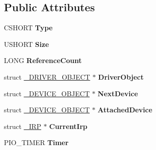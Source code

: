 \subsection*{Public Attributes}
\begin{DoxyCompactItemize}
\item 
\hypertarget{struct__DEVICE__OBJECT_aa853bf7717fd7265dde1ec5466b9235d}{}C\+S\+H\+O\+R\+T {\bfseries Type}\label{struct__DEVICE__OBJECT_aa853bf7717fd7265dde1ec5466b9235d}

\item 
\hypertarget{struct__DEVICE__OBJECT_ae5b447d318de73f431238d3339dd2c8c}{}U\+S\+H\+O\+R\+T {\bfseries Size}\label{struct__DEVICE__OBJECT_ae5b447d318de73f431238d3339dd2c8c}

\item 
\hypertarget{struct__DEVICE__OBJECT_afe2db4a77b5b7c42471e1739bbe73620}{}L\+O\+N\+G {\bfseries Reference\+Count}\label{struct__DEVICE__OBJECT_afe2db4a77b5b7c42471e1739bbe73620}

\item 
\hypertarget{struct__DEVICE__OBJECT_aa348e63c959deea24ebca194cb369b39}{}struct \hyperlink{struct__DRIVER__OBJECT}{\+\_\+\+D\+R\+I\+V\+E\+R\+\_\+\+O\+B\+J\+E\+C\+T} $\ast$ {\bfseries Driver\+Object}\label{struct__DEVICE__OBJECT_aa348e63c959deea24ebca194cb369b39}

\item 
\hypertarget{struct__DEVICE__OBJECT_a38fb5f8eba39b36af126c95960bb4c2d}{}struct \hyperlink{struct__DEVICE__OBJECT}{\+\_\+\+D\+E\+V\+I\+C\+E\+\_\+\+O\+B\+J\+E\+C\+T} $\ast$ {\bfseries Next\+Device}\label{struct__DEVICE__OBJECT_a38fb5f8eba39b36af126c95960bb4c2d}

\item 
\hypertarget{struct__DEVICE__OBJECT_a5bb1b3807827e672ce7479d598ed8ddf}{}struct \hyperlink{struct__DEVICE__OBJECT}{\+\_\+\+D\+E\+V\+I\+C\+E\+\_\+\+O\+B\+J\+E\+C\+T} $\ast$ {\bfseries Attached\+Device}\label{struct__DEVICE__OBJECT_a5bb1b3807827e672ce7479d598ed8ddf}

\item 
\hypertarget{struct__DEVICE__OBJECT_a758007785e95afcea32a5f8601d1926f}{}struct \hyperlink{struct__IRP}{\+\_\+\+I\+R\+P} $\ast$ {\bfseries Current\+Irp}\label{struct__DEVICE__OBJECT_a758007785e95afcea32a5f8601d1926f}

\item 
\hypertarget{struct__DEVICE__OBJECT_aa75c75fdccadb03e21035de620f54991}{}P\+I\+O\+\_\+\+T\+I\+M\+E\+R {\bfseries Timer}\label{struct__DEVICE__OBJECT_aa75c75fdccadb03e21035de620f54991}


\end{DoxyCompactItemize}
